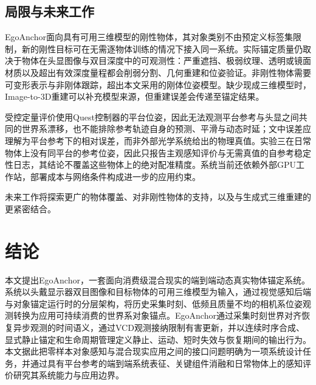 \documentclass[review]{vgtc}
\begin{document}
\subsection{局限与未来工作}

EgoAnchor面向具有可用三维模型的刚性物体，其对象类别不由预定义标签集限制，新的刚性目标可在无需逐物体训练的情况下接入同一系统。实际锚定质量仍取决于物体在头显图像与双目深度中的可观测性：严重遮挡、极弱纹理、透明或镜面材质以及超出有效深度量程都会削弱分割、几何重建和位姿验证。非刚性物体需要可变形表示与非刚体跟踪，超出本文采用的刚体位姿模型。缺少现成三维模型时，Image-to-3D重建可以补充模型来源，但重建误差会传递至锚定结果。

受控定量评价使用Quest控制器的平台位姿，因此无法观测平台参考与头显之间共同的世界系漂移，也不能排除参考轨迹自身的预测、平滑与动态时延；文中误差应理解为平台参考下的相对误差，而非外部光学系统给出的物理真值。实验三在日常物体上没有同平台的参考位姿，因此只报告主观感知评价与无需真值的自参考稳定性日志，其结论不覆盖这些物体上的绝对配准精度。系统当前还依赖外部GPU工作站，部署成本与网络条件构成进一步的应用约束。

未来工作将探索更广的物体覆盖、对非刚性物体的支持，以及与生成式三维重建的更紧密结合。

\section{结论}\label{sec:conclusion}

本文提出EgoAnchor，一套面向消费级混合现实的端到端动态真实物体锚定系统。系统以头戴显示器双目图像和目标物体的可用三维模型为输入，通过视觉感知后端与对象锚定运行时的分层架构，将历史采集时刻、低频且质量不均的相机系位姿观测转换为应用可持续消费的世界系对象锚点。EgoAnchor通过采集时刻世界对齐恢复异步观测的时间语义，通过VCD观测接纳限制有害更新，并以连续时序合成、显式静止锚定和生命周期管理定义静止、运动、短时失效与恢复期间的输出行为。本文据此把零样本对象感知与混合现实应用之间的接口问题明确为一项系统设计任务，并通过具有平台参考的端到端系统表征、关键组件消融和日常物体上的感知评价研究其系统能力与应用边界。

\clearpage
\raggedbottom



\end{document}
